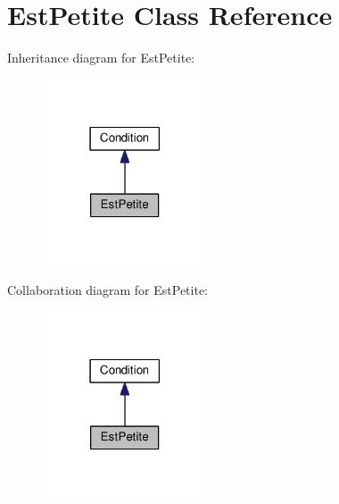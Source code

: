 \hypertarget{class_est_petite}{}\section{Est\+Petite Class Reference}
\label{class_est_petite}


Inheritance diagram for Est\+Petite\+:
\nopagebreak
\begin{figure}[H]
\begin{center}
\leavevmode
\includegraphics[width=138pt]{class_est_petite__inherit__graph}
\end{center}
\end{figure}


Collaboration diagram for Est\+Petite\+:
\nopagebreak
\begin{figure}[H]
\begin{center}
\leavevmode
\includegraphics[width=138pt]{class_est_petite__coll__graph}
\end{center}
\end{figure}
